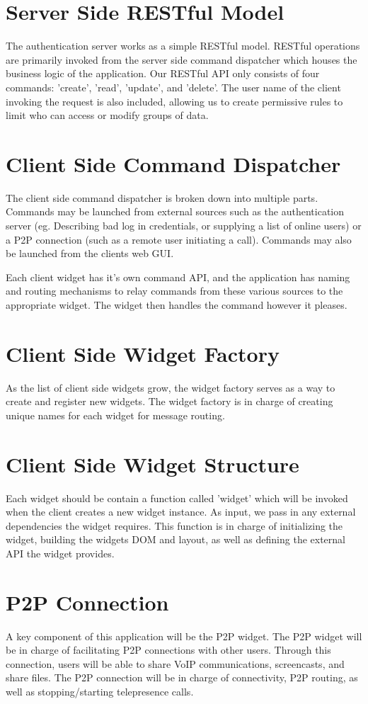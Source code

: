 \documentclass[a4paper,12pt]{report}
\begin{document}
\section{Server Side RESTful Model}
The authentication server works as a simple RESTful model. RESTful operations are primarily invoked from the server side command dispatcher which houses the business logic of the application. Our RESTful API only consists of four commands: 'create', 'read', 'update', and 'delete'. The user name of the client invoking the request is also included, allowing us to create permissive rules to limit who can access or modify groups of data.
\section{Client Side Command Dispatcher}
The client side command dispatcher is broken down into multiple parts. Commands may be launched from external sources such as the authentication server (eg. Describing bad log in credentials, or supplying a list of online users) or a P2P connection (such as a remote user initiating a call). Commands may also be launched from the clients web GUI.

Each client widget has it's own command API, and the application has naming and routing mechanisms to relay commands from these various sources to the appropriate widget. The widget then handles the command however it pleases.
\section{Client Side Widget Factory}
As the list of client side widgets grow, the widget factory serves as a way to create and register new widgets. The widget factory is in charge of creating unique names for each widget for message routing.
\section{Client Side Widget Structure}
Each widget should be contain a function called 'widget' which will be invoked when the client creates a new widget instance. As input, we pass in any external dependencies the widget requires. This function is in charge of initializing the widget, building the widgets DOM and layout, as well as defining the external API the widget provides.
\section{P2P Connection}
A key component of this application will be the P2P widget. The P2P widget will be in charge of facilitating P2P connections with other users. Through this connection, users will be able to share VoIP communications, screencasts, and share files. The P2P connection will be in charge of connectivity, P2P routing, as well as stopping/starting telepresence calls.
\end{document}
